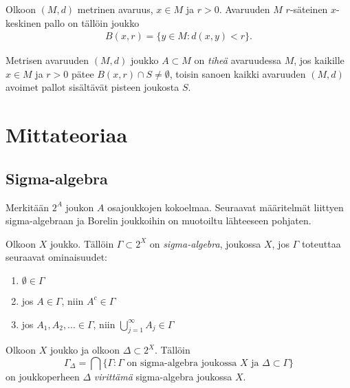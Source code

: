 \documentclass[12pt,oneside,a4paper]{amsbook} %
\begin{document}
\begin{definition}
    Olkoon $(M, d)$ metrinen avaruus, $x \in M$ ja $r > 0$. Avaruuden $M$ $r$-säteinen $x$-keskinen pallo on tällöin joukko
    \begin{align*}
        B(x, r) = \{y \in M : d(x, y) < r\}.
    \end{align*}
\end{definition}

\begin{definition}
    Metrisen avaruuden $(M, d)$ joukko $A \subset M$ on \textit{tiheä} avaruudessa $M$, jos kaikille $x \in M$ ja $r > 0$ pätee $B(x, r) \cap S \ne \emptyset$, toisin sanoen kaikki avaruuden $(M, d)$ avoimet pallot sisältävät pisteen joukosta $S$.
\end{definition}

\section{Mittateoriaa}
\subsection{Sigma-algebra}
Merkitään $2^A$ joukon $A$ osajoukkojen kokoelmaa. Seuraavat määritelmät liittyen sigma-algebraan ja Borelin joukkoihin on muotoiltu lähteeseen \cite[s.86-87]{lehrbäck} pohjaten.

\begin{definition}
    Olkoon $X$ joukko. Tällöin $\Gamma \subset 2^X$ on \textit{sigma-algebra}, joukossa $X$, jos $\Gamma$ toteuttaa seuraavat ominaisuudet:
    \begin{enumerate}
        \item $\emptyset \in \Gamma$ 
        \item jos $A \in \Gamma$, niin $A^c \in \Gamma$
        \item jos $A_1, A_2, ... \in \Gamma$, niin $\bigcup_{j=1}^\infty A_j \in \Gamma$ 
    \end{enumerate}
\end{definition}


\begin{definition}
    Olkoon $X$ joukko ja olkoon $\Delta \subset 2^X$. Tällöin 
        $$ \Gamma_\Delta = \bigcap \{\Gamma : \Gamma \text{ on sigma-algebra joukossa } X \text{ ja }  \Delta \subset \Gamma \}$$ 
    on joukkoperheen $\Delta$ \textit{virittämä} sigma-algebra joukossa $X$.
\end{definition}
\end{document}
